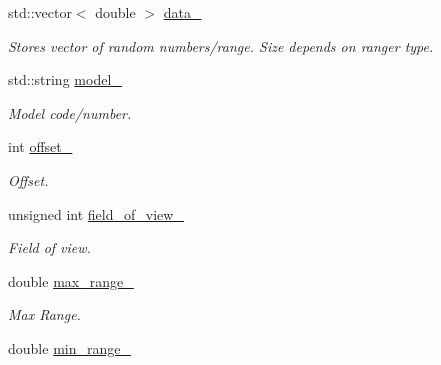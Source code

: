 \begin{DoxyCompactItemize}
\item 
std\+::vector$<$ double $>$ \hyperlink{classRanger_adef7fed47f032646f5023046de0bbc48}{data\+\_\+}
\begin{DoxyCompactList}\small\item\em Stores vector of random numbers/range. Size depends on ranger type. \end{DoxyCompactList}\item 
std\+::string \hyperlink{classRanger_a806db893039467e1f6f66335e8eabb7b}{model\+\_\+}\hypertarget{classRanger_a806db893039467e1f6f66335e8eabb7b}{}\label{classRanger_a806db893039467e1f6f66335e8eabb7b}

\begin{DoxyCompactList}\small\item\em Model code/number. \end{DoxyCompactList}\item 
int \hyperlink{classRanger_add17fe15ea0db50db1f678f9949cfc87}{offset\+\_\+}\hypertarget{classRanger_add17fe15ea0db50db1f678f9949cfc87}{}\label{classRanger_add17fe15ea0db50db1f678f9949cfc87}

\begin{DoxyCompactList}\small\item\em Offset. \end{DoxyCompactList}\item 
unsigned int \hyperlink{classRanger_a1f38aa37632d4b98adcdb772bc29a562}{field\+\_\+of\+\_\+view\+\_\+}\hypertarget{classRanger_a1f38aa37632d4b98adcdb772bc29a562}{}\label{classRanger_a1f38aa37632d4b98adcdb772bc29a562}

\begin{DoxyCompactList}\small\item\em Field of view. \end{DoxyCompactList}\item 
double \hyperlink{classRanger_aa2cc14d1f0d1110b63b4ac96d95610f1}{max\+\_\+range\+\_\+}\hypertarget{classRanger_aa2cc14d1f0d1110b63b4ac96d95610f1}{}\label{classRanger_aa2cc14d1f0d1110b63b4ac96d95610f1}

\begin{DoxyCompactList}\small\item\em Max Range. \end{DoxyCompactList}\item 
double \hyperlink{classRanger_a143fdd2a9b956ce61164d411bc8740b0}{min\+\_\+range\+\_\+}\hypertarget{classRanger_a143fdd2a9b956ce61164d411bc8740b0}{}\label{classRanger_a143fdd2a9b956ce61164d411bc8740b0}


\end{DoxyCompactItemize}
